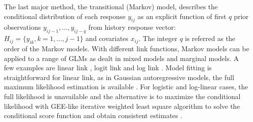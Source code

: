 \documentclass[12pt]{article}
\begin{document}
The last major method, the transitional (Markov) model, describes the conditional distribution of each response $y_{ij}$ as an explicit function of first $q$ prior observations $y_{ij-1},\dots,y_{ij-q}$ from history response vector: $H_{ij} = \{ y_{ik}, k = 1,\dots,j - 1\}$ and covariates $x_{ij}$. The integer $q$ is referred as the order of the Markov models. With different link functions, Markov models can be applied to a range of GLMs as dealt in mixed models and marginal models. A few examples are linear link \cite{tsay1984regression}, logit link \cite{cox1989analysis,zeger1985analysis,korn1979methods} and log link \cite{zeger1988markov}. Model fitting is straightforward for linear link, as in Gaussian autoregressive models, the full maximum likelihood estimation is available \cite{tsay1984regression}. For logistic and log-linear cases, the full likelihood is unavailable and the alternative is to maximize the conditional likelihood with GEE-like iterative weighted least square algorithm to solve the conditional score function and obtain consistent estimates \cite{cox1989analysis,zeger1985analysis,korn1979methods,zeger1988markov}.
\end{document}
